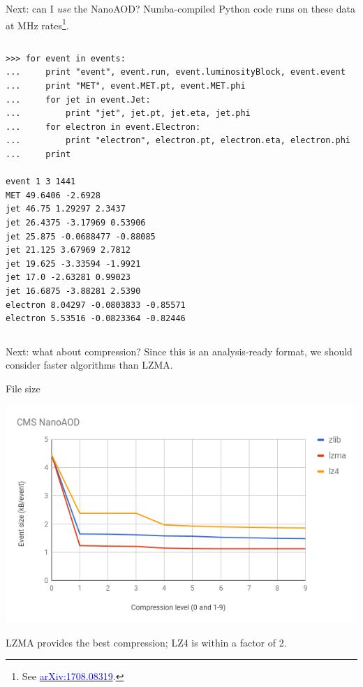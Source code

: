 \documentclass{beamer}
\begin{document}
\begin{frame}[fragile]{Next: can I {\it use} the NanoAOD?}
Numba-compiled Python code runs on these data at MHz rates\footnote{See \href{https://arxiv.org/abs/1708.08319}{\textcolor{blue}{arXiv:1708.08319}}.}.

\begin{columns}
\scriptsize
\begin{verbatim}
>>> for event in events:
...     print "event", event.run, event.luminosityBlock, event.event
...     print "MET", event.MET.pt, event.MET.phi
...     for jet in event.Jet:
...         print "jet", jet.pt, jet.eta, jet.phi
...     for electron in event.Electron:
...         print "electron", electron.pt, electron.eta, electron.phi
...     print

event 1 3 1441
MET 49.6406 -2.6928
jet 46.75 1.29297 2.3437
jet 26.4375 -3.17969 0.53906
jet 25.875 -0.0688477 -0.88085
jet 21.125 3.67969 2.7812
jet 19.625 -3.33594 -1.9921
jet 17.0 -2.63281 0.99023
jet 16.6875 -3.88281 2.5390
electron 8.04297 -0.0803833 -0.85571
electron 5.53516 -0.0823364 -0.82446                                                    
\end{verbatim}
\end{columns}
\end{frame}

\begin{frame}{Next: what about compression?}
\vspace{0.5 cm}
Since this is an analysis-ready format, we should consider faster algorithms than LZMA.

\vspace{1 cm}

\vspace{1 cm}
\end{frame}

\begin{frame}{File size}
\begin{center}
\includegraphics[width=\linewidth]{size-vs-compression.png}
\end{center}

LZMA provides the best compression; LZ4 is within a factor of 2.
\vspace{\baselineskip}
\end{frame}
\end{document}
